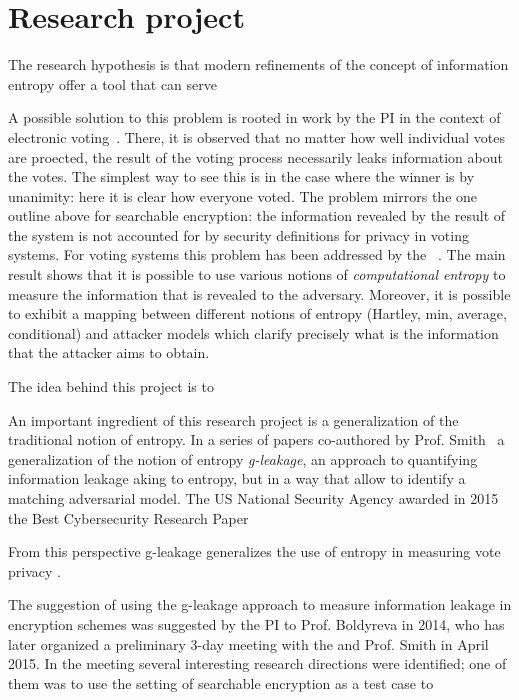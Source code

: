\newpage

\section{Research project}
\label{sec:prop_hyp}

The research hypothesis is that modern refinements of the concept of information entropy offer a tool that can serve 


A possible solution to this problem is rooted in work by the PI in the context of electronic voting~\cite{bernhard2012measuring}. 
There, it is observed that no matter how well individual votes are proected, the result of the voting process necessarily leaks information about the votes.
The simplest way to see this is in the case where the winner is by unanimity: here it is clear how everyone voted.  The problem mirrors the one outline above for searchable encryption:  the information revealed by the result of the system is not accounted for by security definitions for privacy in voting systems. 
For voting systems this problem has been addressed by the \PI~\cite{bernhard2012measuring}. 
The main result shows that it is possible to use various notions of \emph{computational entropy} to measure the information that is revealed to the adversary.  
Moreover, it is possible to exhibit a mapping between different notions of entropy (Hartley, min, average, conditional) and attacker models which clarify precisely what is the information that the attacker aims to obtain. 

The idea behind this project is to 


An important ingredient of this research project is a generalization of the traditional notion of entropy. 
In a series of papers co-authored by Prof. Smith~\cite{DBLP:conf/csfw/AlvimCPS12,DBLP:conf/csfw/AlvimCMMPS14,DBLP:conf/csfw/AlvimCMMPS16,DBLP:conf/csfw/SmithS17} a generalization of the notion of entropy \emph{g-leakage}, 
an approach to quantifying information leakage aking to entropy, but in a way that allow to identify a matching adversarial model.  
The US National Security Agency awarded in 2015 the Best Cybersecurity Research Paper 

From this perspective g-leakage generalizes the use of entropy in measuring vote privacy \cite{bernhard2012measuring}. 

The suggestion of using the g-leakage approach to measure information leakage in encryption schemes was suggested by the PI to Prof. Boldyreva in 2014, who has later organized a preliminary 3-day meeting with the \PI and Prof. Smith in April 2015.  
In the meeting several interesting research directions were identified; one of them was to use the setting of searchable encryption as a test case to 

